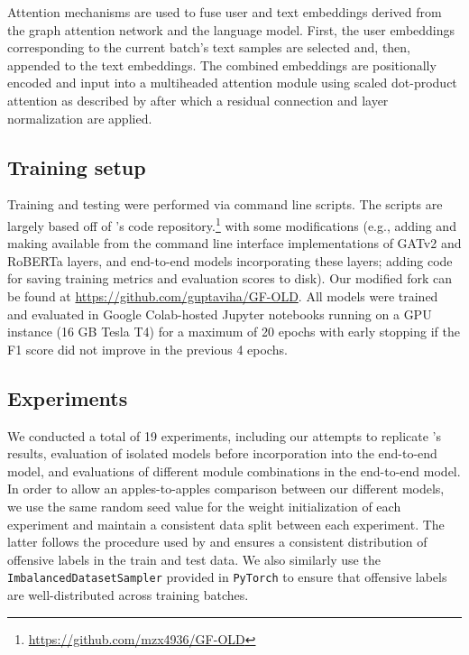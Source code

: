 \documentclass[letterpaper]{article} %
\begin{document}
Attention mechanisms are used to fuse user and text embeddings derived from the graph attention network and the language model. First, the user embeddings corresponding to the current batch's text samples are selected and, then, appended to the text embeddings. The combined embeddings are positionally encoded and input into a multiheaded attention module using scaled dot-product attention as described by \citet{Vaswani2017} after which a residual connection and layer normalization are applied.

\subsection{Training setup}

Training and testing were performed via command line scripts. The scripts are largely based off of \citet{Miao2022}'s code repository.\footnote{\url{https://github.com/mzx4936/GF-OLD}} with some modifications (e.g., adding and making available from the command line interface implementations of GATv2 and RoBERTa layers, and end-to-end models incorporating these layers; adding code for saving training metrics and evaluation scores to disk). Our modified fork can be found at \url{https://github.com/guptaviha/GF-OLD}. All models were trained and evaluated in Google Colab-hosted Jupyter notebooks running on a GPU instance (16 GB Tesla T4) for a maximum of 20 epochs with early stopping if the F1 score did not improve in the previous 4 epochs. 

\subsection{Experiments}

We conducted a total of 19 experiments, including our attempts to replicate \citet{Miao2022}'s results, evaluation of isolated models before incorporation into the end-to-end model, and evaluations of different module combinations in the end-to-end model. In order to allow an apples-to-apples comparison between our different models, we use the same random seed value for the weight initialization of each experiment and maintain a consistent data split between each experiment. The latter follows the procedure used by \citet{Miao2022} and ensures a consistent distribution of offensive labels in the train and test data. We also similarly use the \verb|ImbalancedDatasetSampler| provided in \verb|PyTorch| to ensure that offensive labels are well-distributed across training batches.
\end{document}
